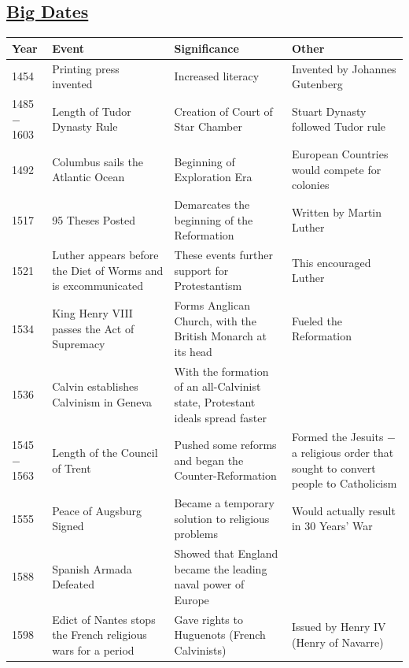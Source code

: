 \documentclass[12pt]{article}
\begin{document}
\begin{enumerate}
\section{\underline{Big Dates}}


\hspace{-25pt}\begin{tabular}{|p{}|p{}|p{}|p{}|}
\hline
Year & Event & Significance & Other \\
\hline
1454 & Printing press invented & Increased literacy & Invented by Johannes Gutenberg \\
\hline
1485$-$1603 & Length of Tudor Dynasty Rule & Creation of Court of Star Chamber & Stuart Dynasty followed Tudor rule  \\
\hline
1492 & Columbus sails the Atlantic Ocean & Beginning of Exploration Era & European Countries would compete for colonies \\
\hline
1517 & 95 Theses Posted & Demarcates the beginning of the Reformation & Written by Martin Luther  \\
\hline
1521 & Luther appears before the Diet of Worms and is excommunicated  & These events further support for Protestantism  & This encouraged Luther  \\
\hline
1534 & King Henry VIII passes the Act of Supremacy & Forms Anglican Church, with the British Monarch at its head  & Fueled the Reformation  \\
\hline
1536 & Calvin establishes Calvinism in Geneva & With the formation of an all-Calvinist state, Protestant ideals spread faster  & \\
\hline
1545$-$1563 & Length of the Council of Trent & Pushed some reforms and began the Counter-Reformation & Formed the Jesuits $-$ a religious order that sought to convert people to Catholicism  \\
\hline
1555 & Peace of Augsburg Signed & Became a temporary solution to religious problems & Would actually result in 30 Years' War \\
\hline
1588 & Spanish Armada Defeated & Showed that England became the leading naval power of Europe & \\
\hline
1598 & Edict of Nantes stops the French religious wars for a period & Gave rights to Huguenots (French Calvinists)  & Issued by Henry IV (Henry of Navarre)  \\
\hline
\end{tabular}
\newpage
\hspace{-25pt}\begin{tabular}{|p{}|p{}|p{}|p{}|}

\end{tabular}
\end{enumerate}
\end{document}
